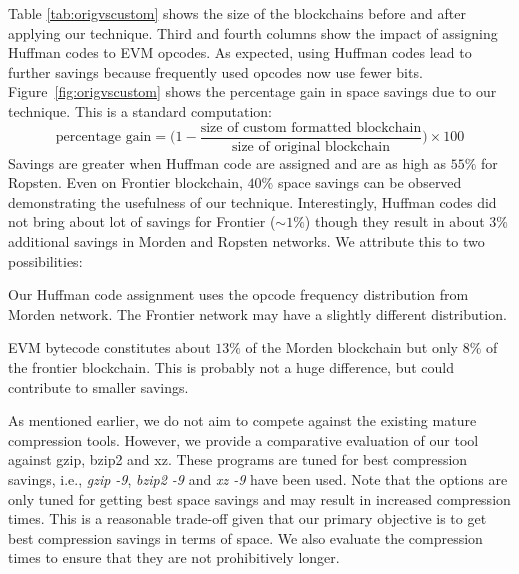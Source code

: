 \FloatBarrier
Table \autoref{tab:origvscustom} shows the size of the blockchains before and after applying our technique. Third and fourth columns show the impact of assigning Huffman codes to EVM opcodes. 
As expected, using Huffman codes lead to further savings because frequently
used opcodes now use fewer bits.
Figure~\ref{fig:origvscustom} shows the percentage gain in space savings due to our technique. This is a standard computation:
\[ 
	\text{percentage gain} = \big ( 1 - \frac{\text{size of custom formatted blockchain}}{\text{size of original blockchain}}\big ) \times 100
\]
Savings are greater when Huffman code are assigned and are as high as $55\%$ for Ropsten. Even on Frontier blockchain, $40\%$ space savings can be observed demonstrating the usefulness of our technique. 
Interestingly, Huffman codes did not bring about lot of savings for Frontier ($\sim1\%$) though they result in about $3\%$ additional savings in Morden and Ropsten networks.
We attribute this to two possibilities:
\begin{enumerate*}
	\item Our Huffman code assignment uses the opcode frequency distribution from Morden network. The Frontier network may have a slightly different distribution.
	\item EVM bytecode constitutes about $13\%$ of the Morden blockchain  but only $8\%$ of the frontier blockchain. 
		This is probably not a huge difference, but could contribute to smaller savings.
\end{enumerate*}

As mentioned earlier, we do not aim to compete against the existing mature compression tools.
However, we provide a comparative evaluation of our tool against gzip, bzip2 and xz. 
These programs are tuned for best compression savings, i.e., \emph{gzip -9}, \emph{bzip2 -9} and \emph{xz -9} have been used. 
Note that the options are only tuned for getting best space savings and may result in increased compression times.
This is a reasonable trade-off given that our primary objective is to get best compression savings in terms of space.
We also evaluate the compression times to ensure that they are not
prohibitively longer.

